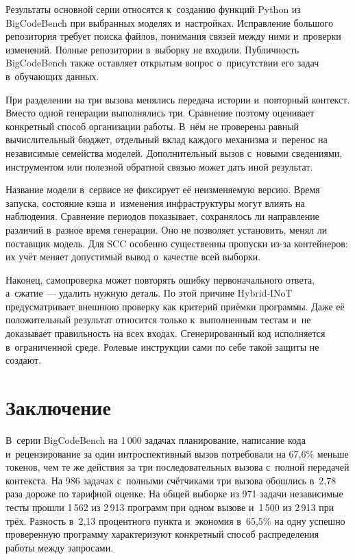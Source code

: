 Результаты основной серии относятся к~созданию функций Python из BigCodeBench при выбранных моделях и~настройках. Исправление большого репозитория требует поиска файлов, понимания связей между ними и~проверки изменений. Полные репозитории в~выборку не входили. Публичность BigCodeBench также оставляет открытым вопрос о~присутствии его задач в~обучающих данных.

При разделении на три вызова менялись передача истории и~повторный контекст. Вместо одной генерации выполнялись три. Сравнение поэтому оценивает конкретный способ организации работы. В~нём не проверены равный вычислительный бюджет, отдельный вклад каждого механизма и~перенос на независимые семейства моделей. Дополнительный вызов с~новыми сведениями, инструментом или полезной обратной связью может дать иной результат.

Название модели в~сервисе не фиксирует её неизменяемую версию. Время запуска, состояние кэша и~изменения инфраструктуры могут влиять на наблюдения. Сравнение периодов показывает, сохранялось ли направление различий в~разное время генерации. Оно не позволяет установить, менял ли поставщик модель. Для SCC особенно существенны пропуски из-за контейнеров: их учёт меняет допустимый вывод о~качестве всей выборки.

Наконец, самопроверка может повторять ошибку первоначального ответа, а~сжатие --- удалить нужную деталь. По этой причине Hybrid-INoT предусматривает внешнюю проверку как критерий приёмки программы. Даже её положительный результат относится только к~выполненным тестам и~не доказывает правильность на всех входах. Сгенерированный код исполняется в~ограниченной среде. Ролевые инструкции сами по себе такой защиты не создают.

\section{Заключение}
В~серии BigCodeBench на 1\,000 задачах планирование, написание кода и~рецензирование за один интроспективный вызов потребовали на 67,6\% меньше токенов, чем те же действия за три последовательных вызова с~полной передачей контекста. На 986 задачах с~полными счётчиками три вызова обошлись в~2,78 раза дороже по тарифной оценке. На общей выборке из 971 задачи независимые тесты прошли 1\,562 из 2\,913 программ при одном вызове и~1\,500 из 2\,913 при трёх. Разность в~2,13 процентного пункта и~экономия в~65,5\% на одну успешно проверенную программу характеризуют конкретный способ распределения работы между запросами.


